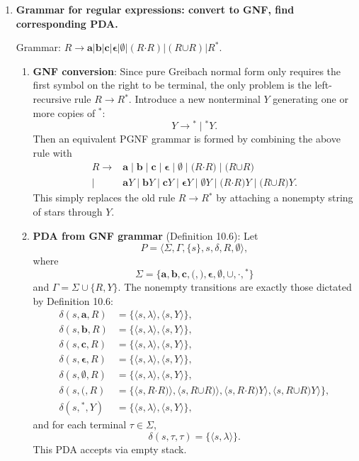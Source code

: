 \begin{enumerate}[{10.}1. ]
\item \textbf{Grammar for regular expressions: convert to GNF, find corresponding PDA.}

Grammar: $R \to \pmb{a}|\pmb{b}|\pmb{c}|\pmb{\epsilon}|\pmb{\emptyset}|(R\pmb{\cdot}R)|(R\pmb{\cup}R)|R^{\pmb{*}}$.

\begin{enumerate}
\item \textbf{GNF conversion}: Since pure Greibach normal form only requires the first symbol on the right to be terminal, the only problem is the left-recursive rule $R\rightarrow R\pmb{^*}$. Introduce a new nonterminal $Y$ generating one or more copies of $\pmb{^*}$:
\[
Y\rightarrow \pmb{^*}\mid \pmb{^*}Y.
\]
Then an equivalent PGNF grammar is formed by combining the above rule with
\begin{align*}
R \rightarrow& \pmb{a}\mid \pmb{b}\mid \pmb{c}\mid \pmb{\epsilon}\mid \pmb{\emptyset}\mid
\pmb{(}R\pmb{\cdot}R\pmb{)}\mid \pmb{(}R\pmb{\cup}R\pmb{)} \\
\mid& \pmb{a}Y\mid \pmb{b}Y\mid \pmb{c}Y\mid \pmb{\epsilon}Y\mid \pmb{\emptyset}Y\mid
\pmb{(}R\pmb{\cdot}R\pmb{)}Y\mid \pmb{(}R\pmb{\cup}R\pmb{)}Y .
\end{align*}
This simply replaces the old rule $R\rightarrow R\pmb{^*}$ by attaching a nonempty string of stars through $Y$.

\item \textbf{PDA from GNF grammar} (Definition 10.6): Let
\[
P=\langle\Sigma,\Gamma,\{s\},s,\delta,R,\emptyset\rangle,
\]
where
\[
\Sigma=\{\pmb{a},\pmb{b},\pmb{c},\pmb{(},\pmb{)},\pmb{\epsilon},\pmb{\emptyset},
\pmb{\cup},\pmb{\cdot},\pmb{^*}\}
\]
and $\Gamma=\Sigma\cup\{R,Y\}$. The nonempty transitions are exactly those dictated by Definition 10.6:
\begin{align*}
\delta(s,\pmb{a},R)&=\{\langle s,\lambda\rangle,\langle s,Y\rangle\}, \\
\delta(s,\pmb{b},R)&=\{\langle s,\lambda\rangle,\langle s,Y\rangle\}, \\
\delta(s,\pmb{c},R)&=\{\langle s,\lambda\rangle,\langle s,Y\rangle\}, \\
\delta(s,\pmb{\epsilon},R)&=\{\langle s,\lambda\rangle,\langle s,Y\rangle\}, \\
\delta(s,\pmb{\emptyset},R)&=\{\langle s,\lambda\rangle,\langle s,Y\rangle\}, \\
\delta(s,\pmb{(},R)&=\{\langle s,R\pmb{\cdot}R\pmb{)}\rangle,\langle s,R\pmb{\cup}R\pmb{)}\rangle,
\langle s,R\pmb{\cdot}R\pmb{)}Y\rangle,\langle s,R\pmb{\cup}R\pmb{)}Y\rangle\}, \\
\delta(s,\pmb{^*},Y)&=\{\langle s,\lambda\rangle,\langle s,Y\rangle\},
\end{align*}
and for each terminal $\tau\in\Sigma$,
\[
\delta(s,\tau,\tau)=\{\langle s,\lambda\rangle\}.
\]
This PDA accepts via empty stack.


\end{enumerate}
\end{enumerate}
